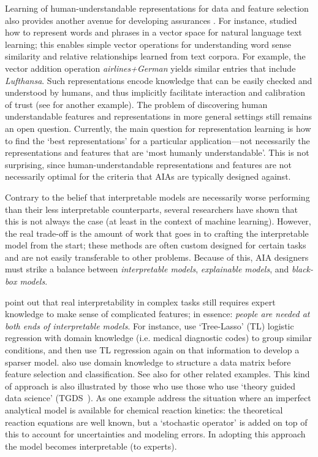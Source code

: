 Learning of human-understandable representations for data and feature selection also provides another avenue for developing assurances  \cite{Bengio2013-uv, Guyon2003-fj}. For instance, \citet{Mikolov2013-lt} studied how to represent words and phrases in a vector space for natural language text learning; this enables simple vector operations for understanding word sense similarity and relative relationships learned from text corpora. For example, the vector addition operation \emph{airlines+German} yields similar entries that include \emph{Lufthansa}. Such representations encode knowledge that can be easily checked and understood by humans, and thus implicitly facilitate interaction and calibration of trust (see \cite{Haury2011-zi} for another example). The problem of discovering human understandable features and representations in more general settings still remains an open question. Currently, the main question for representation learning is how to find the `best representations' for a particular application---not necessarily the representations and features that are `most humanly understandable'. This is not surprising, since human-understandable representations and features are not necessarily optimal for the criteria that AIAs are typically designed against. 

Contrary to the belief that interpretable models are necessarily worse performing than their less interpretable counterparts, several researchers have shown that this is not always the case (at least in the context of machine learning). However, the real trade-off is the amount of work that goes in to crafting the interpretable model from the start; these methods are often custom designed for certain tasks and are not easily transferable to other problems. Because of this, AIA designers must strike a balance between \emph{interpretable models}, \emph{explainable models}, and \emph{black-box models}.

\citet{Park2016-ld} point out that real interpretability in complex tasks still requires expert knowledge to make sense of complicated features; in essence: \emph{people are needed at both ends of interpretable models}. For instance, \citet{Jovanovic2016-gw} use `Tree-Lasso' (TL) logistic regression with domain knowledge (i.e. medical diagnostic codes) to group similar conditions, and then use TL regression again on that information to develop a sparser model. \citet{Zycinski2012-jj} also use domain knowledge to structure a data matrix before feature selection and classification. See also \citet{Zhang2018-no,Khoa2018-gh} for other related examples. 
%
This kind of approach is also illustrated by those who use those who use `theory guided data science' (TGDS~\cite{Kumar2016-yw,Faghmous2014-og}). As one example \citet{Morrison2018-fz} address the situation where an imperfect analytical model is available for chemical reaction kinetics: the theoretical reaction equations are well known, but a `stochastic operator' is added on top of this to account for uncertainties and modeling errors. In adopting this approach the model becomes interpretable (to experts).


